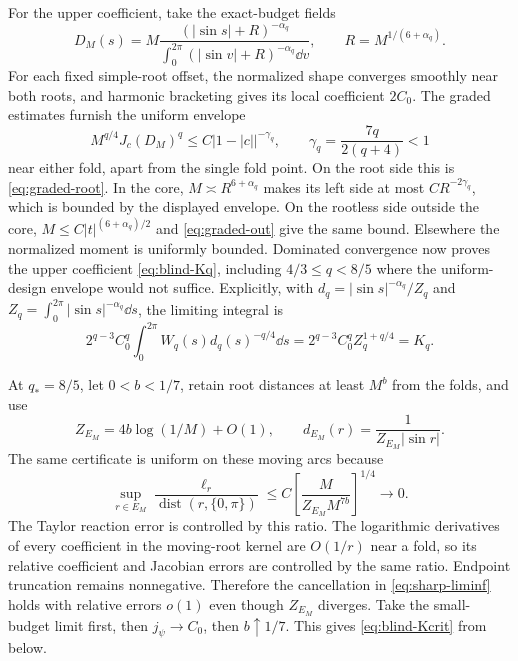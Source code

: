 For the upper coefficient, take the exact-budget fields
\begin{equation}\label{eq:sharp-subcritical-design}
 D_M(s)=M\frac{(|\sin s|+R)^{-\alpha_q}}
                 {\int_0^{2\pi}(|\sin v|+R)^{-\alpha_q}\dd v},
 \qquad R=M^{1/(6+\alpha_q)}.
\end{equation}
For each fixed simple-root offset, the normalized shape converges
smoothly near both roots, and harmonic bracketing gives its local
coefficient $2C_0$. The graded estimates furnish the uniform envelope
\begin{equation}\label{eq:subcrit-envelope}
 M^{q/4}J_c(D_M)^q\le C|1-|c||^{-\gamma_q},\qquad
 \gamma_q=\frac{7q}{2(q+4)}<1
\end{equation}
near either fold, apart from the single fold point. On the root side
this is \eqref{eq:graded-root}. In the core, $M\asymp R^{6+\alpha_q}$
makes its left side at most $CR^{-2\gamma_q}$, which is bounded by
the displayed envelope. On the rootless side outside the core,
$M\le C|t|^{(6+\alpha_q)/2}$ and \eqref{eq:graded-out} give the same
bound. Elsewhere the normalized moment is uniformly bounded.
Dominated convergence now proves the upper coefficient
\eqref{eq:blind-Kq}, including $4/3\le q<8/5$ where the uniform-design
envelope would not suffice. Explicitly, with
$d_q=|\sin s|^{-\alpha_q}/Z_q$ and
$Z_q=\int_0^{2\pi}|\sin s|^{-\alpha_q}\dd s$, the limiting integral is
\[
 2^{q-3}C_0^q\int_0^{2\pi}W_q(s)d_q(s)^{-q/4}\dd s
       =2^{q-3}C_0^q Z_q^{1+q/4}=K_q.
\]

At $q_*=8/5$, let $0<b<1/7$, retain root distances at least $M^b$
from the folds, and use
\[
 Z_{E_M}=4b\log(1/M)+O(1),\qquad
 d_{E_M}(r)=\frac1{Z_{E_M}|\sin r|}.
\]
The same certificate is uniform on these moving arcs because
\begin{equation}\label{eq:critical-small-error}
 \sup_{r\in E_M}\frac{\ell_r}{\operatorname{dist}(r,\{0,\pi\})}
 \le C\left[\frac{M}{Z_{E_M}M^{7b}}\right]^{1/4}\longrightarrow0.
\end{equation}
The Taylor reaction error is controlled by this ratio. The logarithmic
derivatives of every coefficient in the moving-root kernel are
$O(1/r)$ near a fold, so its relative coefficient and Jacobian errors
are controlled by the same ratio. Endpoint truncation remains
nonnegative. Therefore the cancellation in \eqref{eq:sharp-liminf}
holds with relative errors $o(1)$ even though $Z_{E_M}$ diverges.
Take the small-budget limit first, then $j_\psi\to C_0$, then
$b\uparrow1/7$. This gives \eqref{eq:blind-Kcrit} from below.

